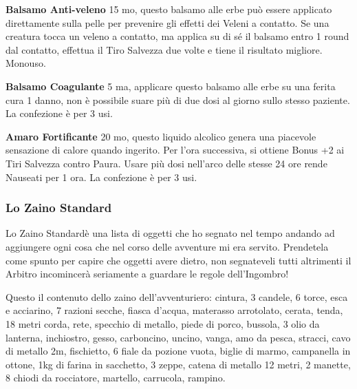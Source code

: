 \documentclass[12pt,a4paper,twoside,openany]{book}
\begin{document}
\begin{multicols}{2}
\textbf{Balsamo Anti-veleno} 15 mo, questo balsamo alle erbe può essere applicato direttamente sulla pelle per prevenire gli effetti dei Veleni a contatto. Se una creatura tocca un veleno a contatto, ma applica su di sé il balsamo entro 1 round dal contatto, effettua il Tiro Salvezza due volte e tiene il risultato migliore. Monouso.

\textbf{Balsamo Coagulante} 5 ma, applicare questo balsamo alle erbe su una ferita cura 1 danno, non è possibile suare più di due dosi al giorno sullo stesso paziente. La confezione è per 3 usi.

\textbf{Amaro Fortificante} 20 mo, questo liquido alcolico genera una piacevole sensazione di calore quando ingerito. Per l'ora successiva, si ottiene Bonus +2 ai Tiri Salvezza contro Paura. Usare più dosi nell'arco delle stesse 24 ore rende Nauseati per 1 ora. La confezione è per 3 usi.


\subsubsection{Lo Zaino Standard\texorpdfstring{\huge{\textregistered}}{\textregistered}} 

Lo Zaino Standard\textregistered \space è una lista di oggetti che ho segnato nel tempo andando ad aggiungere ogni cosa che nel corso delle avventure mi era servito.
Prendetela come spunto per capire che oggetti avere dietro, non segnateveli tutti altrimenti il Arbitro incomincerà seriamente a guardare le regole dell'Ingombro!

Questo il contenuto dello zaino dell'avventuriero: cintura, 3 candele, 6 torce, esca e acciarino, 7 razioni secche, fiasca d'acqua, materasso arrotolato, cerata, tenda, 18 metri corda, rete, specchio di metallo, piede di porco, bussola, 3 olio da lanterna, inchiostro, gesso, carboncino, uncino, vanga, amo da pesca, stracci, cavo di metallo 2m, fischietto, 6 fiale da pozione vuota, biglie di marmo, campanella in ottone, 1kg di farina in sacchetto, 3 zeppe, catena di metallo 12 metri, 2 manette, 8 chiodi da rocciatore, martello, carrucola, rampino.



\end{multicols}

\pagebreak
\end{document}
